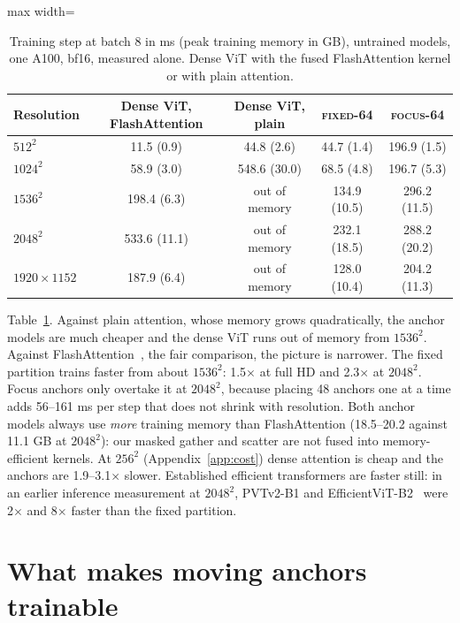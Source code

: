 \documentclass[runningheads]{llncs}
\newcommand{\focus}{\textsc{focus}}
\newcommand{\fixed}{\textsc{fixed}}
\begin{document}
\begin{table}[t]
\centering
\caption{Training step at batch 8 in ms (peak training memory in GB), untrained models, one A100,
bf16, measured alone. Dense ViT with the fused FlashAttention kernel or with plain attention.}
\label{tab:cost}
\begin{adjustbox}{max width=\linewidth}
\begin{tabular}{lcccc}
\toprule
Resolution & Dense ViT, FlashAttention & Dense ViT, plain & \fixed-64 & \focus-64 \\
\midrule
$512^2$ & 11.5 (0.9) & 44.8 (2.6) & 44.7 (1.4) & 196.9 (1.5) \\
$1024^2$ & 58.9 (3.0) & 548.6 (30.0) & 68.5 (4.8) & 196.7 (5.3) \\
$1536^2$ & 198.4 (6.3) & out of memory & 134.9 (10.5) & 296.2 (11.5) \\
$2048^2$ & 533.6 (11.1) & out of memory & 232.1 (18.5) & 288.2 (20.2) \\
$1920\times1152$ & 187.9 (6.4) & out of memory & 128.0 (10.4) & 204.2 (11.3) \\
\bottomrule
\end{tabular}
\end{adjustbox}
\end{table}

Table~\ref{tab:cost}. Against plain attention, whose memory grows quadratically, the anchor models
are much cheaper and the dense ViT runs out of memory from $1536^2$. Against
FlashAttention~\cite{dao2022flashattention}, the fair comparison, the picture is narrower. The
fixed partition trains faster from about $1536^2$: 1.5$\times$ at full HD and 2.3$\times$ at
$2048^2$. Focus anchors only overtake it at $2048^2$, because placing 48 anchors one at a time
adds 56--161 ms per step that does not shrink with resolution. Both anchor models always use
\emph{more} training memory than FlashAttention (18.5--20.2 against 11.1 GB at $2048^2$): our
masked gather and scatter are not fused into memory-efficient kernels. At $256^2$
(Appendix~\ref{app:cost}) dense attention is cheap and the anchors are 1.9--3.1$\times$ slower.
Established efficient transformers are faster still: in an earlier inference measurement at
$2048^2$, PVTv2-B1 and EfficientViT-B2~\cite{cai2023efficientvit} were 2$\times$ and 8$\times$
faster than the fixed partition.

\section{What makes moving anchors trainable}
\label{sec:stability}
\end{document}
